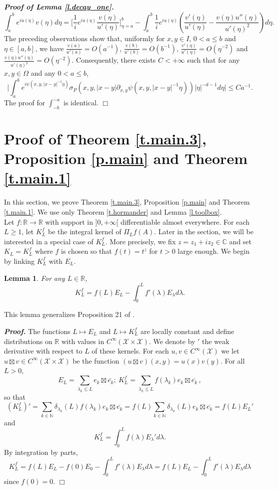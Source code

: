 \documentclass[10pt,twoside]{article}
\newcommand{\R}{\mathbb{R}}
\newcommand{\C}{\mathbb{C}}
\newcommand{\N}{\mathbb{N}}
\newcommand{\man}{\mathcal{X}}
\newenvironment{prf}[1][]
{\vskip 2mm  {\it \bf Proof#1. }}{$\Box$ \vskip 2mm}
\numberwithin{theorem}{section}
\newtheorem{lemma}[theorem]{Lemma}
\begin{document}
\begin{prf}[ of Lemma \ref{l.decay_one}]
  \[\int_a^be^{iu(\eta)}v(\eta)d\eta=\Big[\frac{1}{i}e^{iu(\eta)}\frac{v(\eta)}{u'(\eta)}\Big]^{b}_{\eta=a}-\int_a^b\frac{1}{i}e^{iu(\eta)}\left(\frac{v'(\eta)}{u'(\eta)}-\frac{v(\eta)u''(\eta)}{u'(\eta)^2}\right)d\eta.\]
  The preceding observations show that, uniformly for $x,y\in I$, $0<a\leq b$ and $\eta\in[a,b]$, we have $\frac{v(a)}{u'(a)}=O(a^{-1})$, $\frac{v(b)}{u'(b)}=O(b^{-1})$, $\frac{v'(\eta)}{u'(\eta)}=O(\eta^{-2})$ and $\frac{v(\eta)u''(\eta)}{u'(\eta)^2}=O(\eta^{-2})$. Consequently, there exists $C<+\infty$ such that for any $x,y\in \Omega$ and any $0<a\leq b$,
\[\Big|\int_a^be^{i\psi(x,y,|x-y|^{-1}\eta)}\sigma_P(x,y,|x-y|\partial_{x,y}\psi(x,y,|x-y|^{-1}\eta))|\eta|^{-d-1}d\eta\Big|\leq Ca^{-1}.\]
The proof for $\int_{-b}^{-a}$ is identical.
\end{prf}

\section{Proof of Theorem \ref{t.main.3}, Proposition \ref{p.main} and Theorem \ref{t.main.1}}\label{s.proofs.1}

In this section, we prove Theorem \ref{t.main.3}, Proposition \ref{p.main} and Theorem \ref{t.main.1}. We use only Theorem \ref{t.hormander} and Lemma \ref{l.toolbox}.\\

Let $f:\R\rightarrow\R$ with support in $]0,+\infty[$ differentiable almost everywhere. For each $L\geq 1$, let $K_L^f$ be the integral kernel of $\Pi_Lf(A)$. Later in the section, we will be interested in a special case of $K^f_L$. More precisely, we fix $z=z_1+iz_2\in\C$ and set $K_L=K^f_L$ where $f$ is chosen so that $f(t)=t^z$ for $t>0$ large enough. We begin by linking $K_L^f$ with $E_L$.

\begin{lemma}\label{l.link}
For any $L\in\R$,
\[K_L^f=f(L)E_L-\int_0^Lf'(\lambda)E_\lambda d\lambda.\]
\end{lemma}

This lemma generalizes Proposition 21 of \cite{ale161}.

\begin{prf}
The functions $L\mapsto E_L$ and $L\mapsto K_L^f$ are locally constant and define distributions on $\R$ with values in $C^\infty(\man\times\man)$. We denote by $'$ the weak derivative with respect to $L$ of these kernels. For each $u,v\in C^\infty(\man)$ we let $u\boxtimes v\in C^\infty(\man\times\man)$ be the function $(u\boxtimes v)(x,y)=u(x)v(y)$. For all $L>0$,
\[
E_L=\sum_{\lambda_k\leq L} e_k\boxtimes\overline{e_k};\ K_L^f=\sum_{\lambda_k\leq L}f(\lambda_k)e_k\boxtimes\overline{e_k}\, ,
\]
so that
\[
\left(K_L^f\right)'=\sum_{k\in\N}\delta_{\lambda_k}(L)f(\lambda_k)e_k\boxtimes\overline{e_k}=f(L)\sum_{k\in\N}\delta_{\lambda_k}(L)e_k\boxtimes\overline{e_k}=f(L)E_L'
\]
and
\[K_L^f=\int_0^Lf(\lambda)E_\lambda'd\lambda.\]
By integration by parts,
\[K_L^f=f(L)E_L-f(0)E_0-\int_0^Lf'(\lambda)E_\lambda d\lambda = f(L)E_L-\int_0^Lf'(\lambda) E_\lambda d\lambda\]
since $f(0)=0$.
\end{prf}
\end{document}
